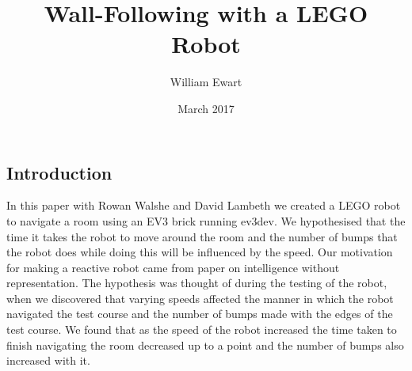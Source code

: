 \documentclass[12pt, letterpaper]{article}
\title{Wall-Following with a LEGO Robot}
\author{William Ewart}
\date{March 2017}
\begin{document}
\begin{titlingpage}
\maketitle
\tableofcontents
\end{titlingpage}
\newpage

\begin{multicols}{2}
\section{Introduction}
In this paper with Rowan Walshe and David Lambeth we created a LEGO robot to navigate a room using an EV3 brick running ev3dev. We hypothesised that the time it takes the robot to move around the room and the number of bumps that the robot does while doing this will be influenced by the speed. Our motivation for making a reactive robot came from \cite{Brooks} paper on intelligence without representation. The hypothesis was thought of during the testing of the robot, when we discovered that varying speeds affected the manner in which the robot navigated the test course and the number of bumps made with the edges of the test  course. We found that as the speed of the robot increased the time taken to finish navigating the room decreased up to a point and the number of bumps also increased with it. 

\end{multicols}
\end{document}
